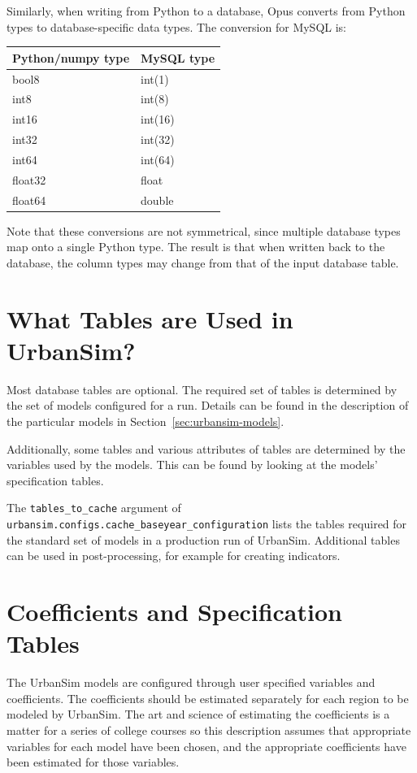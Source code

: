 Similarly, when writing from Python to a database, Opus converts from Python
types to database-specific data types.  The conversion for MySQL is:

\begin{tabular}{ll}
Python/numpy type & MySQL type \\
\hline
bool8 & int(1) \\
int8 & int(8) \\
int16 & int(16) \\
int32 & int(32) \\
int64 & int(64) \\
float32 & float \\
float64 & double \\
\end{tabular}

Note that these conversions are not symmetrical, since multiple
database types map onto a single Python type.  The result is that
when written back to the database, the column types may change from
that of the input database table.

\section{What Tables are Used in UrbanSim?}
%
Most database tables are optional. The required set of tables is determined by the set of models configured for
a run. Details can be found in the description of the particular models in Section~\ref{sec:urbansim-models}. 

Additionally, some tables and various attributes of tables are determined by 
the variables \variablesindex used by the models.  This can be found by looking at the models'
specification tables.

The \verb|tables_to_cache| argument of
\verb|urbansim.configs.cache_baseyear_configuration| lists the tables required for the standard set of models \modelsindex 
in a production run of UrbanSim. Additional tables can be used in post-processing, for example for creating
indicators.


\section{Coefficients and Specification Tables}

The UrbanSim models \modelsindex are configured through user specified
variables and coefficients. \coefficientsindex The coefficients should be
estimated separately for each region to be modeled by UrbanSim. The art and
science of estimating the coefficients is a matter for a series of college
courses so this description assumes that appropriate variables for each model
have been chosen, and the appropriate coefficients have been estimated for
those variables.

